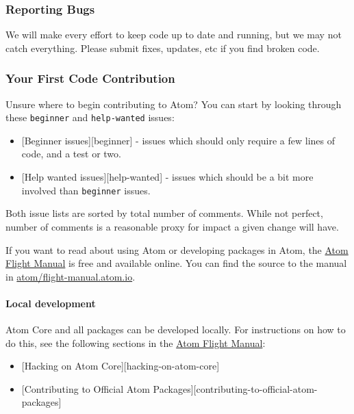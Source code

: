\hypertarget{reporting-bugs}{%
\subsubsection{Reporting Bugs}\label{reporting-bugs}}

We will make every effort to keep code up to date and running, but we
may not catch everything. Please submit fixes, updates, etc if you find
broken code.

\hypertarget{your-first-code-contribution}{%
\subsubsection{Your First Code
Contribution}\label{your-first-code-contribution}}

Unsure where to begin contributing to Atom? You can start by looking
through these \texttt{beginner} and \texttt{help-wanted} issues:

\begin{itemize}
\tightlist
\item
  {[}Beginner issues{]}{[}beginner{]} - issues which should only require
  a few lines of code, and a test or two.
\item
  {[}Help wanted issues{]}{[}help-wanted{]} - issues which should be a
  bit more involved than \texttt{beginner} issues.
\end{itemize}

Both issue lists are sorted by total number of comments. While not
perfect, number of comments is a reasonable proxy for impact a given
change will have.

If you want to read about using Atom or developing packages in Atom, the
\href{https://flight-manual.atom.io}{Atom Flight Manual} is free and
available online. You can find the source to the manual in
\href{https://github.com/atom/flight-manual.atom.io}{atom/flight-manual.atom.io}.

\hypertarget{local-development}{%
\paragraph{Local development}\label{local-development}}

Atom Core and all packages can be developed locally. For instructions on
how to do this, see the following sections in the
\href{https://flight-manual.atom.io}{Atom Flight Manual}:

\begin{itemize}
\tightlist
\item
  {[}Hacking on Atom Core{]}{[}hacking-on-atom-core{]}
\item
  {[}Contributing to Official Atom
  Packages{]}{[}contributing-to-official-atom-packages{]}
\end{itemize}

